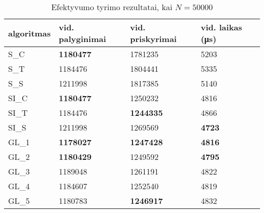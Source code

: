 \documentclass{VUMIFInfKursinis}
\begin{document}
\begin{table}[H]
  \caption{Efektyvumo tyrimo rezultatai, kai $N = 50000$}
  \label{results_50000}
  \centering
  \begin{tabular}{llll}
    algoritmas & vid. palyginimai                         & vid. priskyrimai                         & vid. laikas (μs)                      \\ \midrule
    S\_C       & \cellcolor[HTML]{70AD47}\textbf{1180477} & 1781235                                  & 5203                                  \\
    S\_T       & 1184476                                  & 1804441                                  & 5335                                  \\
    S\_S       & 1211998                                  & 1817385                                  & 5140                                  \\
    SI\_C      & \cellcolor[HTML]{70AD47}\textbf{1180477} & 1250232                                  & 4816                                  \\
    SI\_T      & 1184476                                  & \cellcolor[HTML]{70AD47}\textbf{1244335} & 4866                                  \\
    SI\_S      & 1211998                                  & 1269569                                  & \cellcolor[HTML]{70AD47}\textbf{4723} \\
    GL\_1 & \cellcolor[HTML]{70AD47}\textbf{1178027} & \cellcolor[HTML]{70AD47}\textbf{1247428} & \cellcolor[HTML]{70AD47}\textbf{4816} \\
    GL\_2 & \cellcolor[HTML]{70AD47}\textbf{1180429} & 1249592                                  & \cellcolor[HTML]{70AD47}\textbf{4795} \\
    GL\_3      & 1189048                                  & 1261191                                  & 4822                                  \\
    GL\_4      & 1184607                                  & 1252540                                  & 4819                                  \\ \bottomrule
    GL\_5      & 1180783                                  & \cellcolor[HTML]{70AD47}\textbf{1246917} & 4832                                 \\ \bottomrule          
  \end{tabular}
\end{table}
\end{document}
